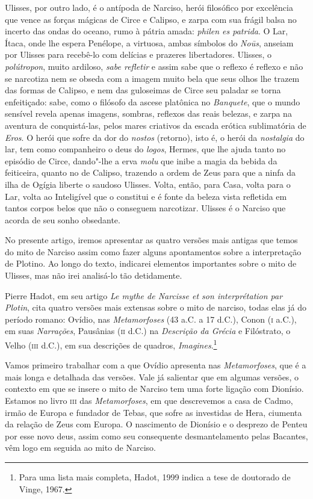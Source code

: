 Ulisses, por outro lado, é o antípoda de Narciso, herói filosófico
por excelência que vence as forças mágicas de Circe e Calipso, e
zarpa com sua frágil balsa no incerto das ondas do oceano, rumo à
pátria amada: \emph{philen es patrida}. O Lar, Ítaca, onde lhe
espera Penélope, a virtuosa, ambas símbolos do \emph{Noūs}, anseiam
por Ulisses para recebê-lo com delícias e prazeres libertadores.
Ulisses, o \emph{polútropon}, muito ardiloso, \emph{sabe
refletir} e assim sabe que o reflexo é reflexo e não se narcotiza nem
se obseda com a imagem muito bela que seus olhos lhe trazem das
formas de Calipso, e nem das guloseimas de Circe seu paladar se torna
enfeitiçado: sabe, como o filósofo da ascese platônica no
\emph{Banquete}, que o mundo sensível revela apenas imagens,
sombras, reflexos das reais belezas, e zarpa na aventura de
conquistá-las, pelos mares criativos da escada erótica sublimatória
de \emph{Eros}. O herói que sofre da dor do \emph{nostos}
(retorno), isto é, o herói da\emph{ nostalgia} do lar, tem como
companheiro o deus do \emph{logos}, Hermes, que lhe ajuda tanto no
episódio de Circe, dando"-lhe a erva \emph{molu} que inibe a magia
da bebida da feiticeira, quanto no de Calipso, trazendo a ordem de
Zeus para que a ninfa da ilha de Ogígia liberte o saudoso Ulisses.
Volta, então, para Casa, volta para o Lar, volta ao Inteligível que o
constitui e é fonte da beleza vista refletida em tantos corpos belos
que não o conseguem narcotizar. Ulisses é o Narciso que acorda de seu
sonho obsedante.

No presente artigo, iremos apresentar as quatro versões mais
antigas que temos do mito de Narciso assim como fazer alguns
apontamentos sobre a interpretação de Plotino. Ao longo do texto,
indicarei elementos importantes sobre o mito de Ulisses, mas não irei
analisá-lo tão detidamente. 

Pierre Hadot, em seu artigo \emph{Le mythe de Narcisse et son
interprétation par Plotin}, cita quatro versões mais extensas sobre o
mito de narciso, todas elas já do período romano: Ovídio, nas
\emph{Metamorfoses} (43 a.C. a 17 d.C.), Conon (\textsc{i} a.C.), em suas
\emph{Narrações}, Pausânias (\textsc{ii} d.C.) na \emph{Descrição da
Grécia} e Filóstrato, o Velho (\textsc{iii} d.C.), em sua descrições de
quadros, \emph{Imagines}.\footnote{ Para uma lista mais completa,
Hadot, 1999 indica a tese de doutorado de Vinge, 1967.}

Vamos primeiro trabalhar com a que Ovídio  
apresenta nas \emph{Metamorfoses}, que é a mais longa e
detalhada das versões. Vale já salientar que em algumas versões, o
contexto em que se insere o mito de Narciso tem uma forte ligação com
Dionísio. Estamos no livro \textsc{iii} das \emph{Metamorfoses}, em que
descrevemos a casa de Cadmo, irmão de Europa e fundador de Tebas, que
sofre as investidas de Hera, ciumenta da relação de Zeus com Europa.
O nascimento de Dionísio e o desprezo de Penteu por esse novo deus,
assim como seu consequente desmantelamento pelas Bacantes, vêm logo
em seguida ao mito de Narciso.

